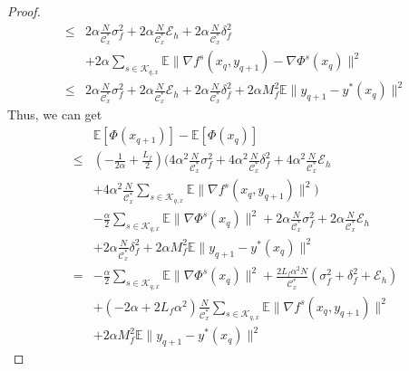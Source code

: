 \documentclass[lettersize,journal]{IEEEtran}
\begin{document}
\begin{proof}
\begin{align*}
    \leq &2\alpha \frac{N}{\mathcal{C}_x^*}\sigma_f^2+2\alpha\frac{N}{\mathcal{C}_x^*}\mathcal{E}_h+2\alpha\frac{N}{\mathcal{C}_x^*}\delta^2_f\\&+ 2\alpha \sum_{s\in \mathcal{K}_{q,x}}\mathbb{E}\|\nabla f^s(x_{q},y_{q+1})-\nabla \Phi^s(x_{q})\|^2\\
    \leq &2\alpha \frac{N}{\mathcal{C}_x^*}\sigma_f^2+2\alpha\frac{N}{\mathcal{C}_x^*}\mathcal{E}_h+2\alpha\frac{N}{\mathcal{C}_x^*}\delta^2_f+2\alpha M_f^2 \mathbb{E}\|y_{q+1}-y^*(x_q)\|^2
\end{align*}
Thus, we can get
\begin{align*}
&\mathbb{E}\left[\Phi(x_{q+1})\right]-\mathbb{E}\left[\Phi(x_q)\right]
\\\leq&(-\frac{1}{2\alpha}+\frac{L_f}{2})(4\alpha^2\frac{N}{\mathcal{C}_x^*}\sigma_f^2+4\alpha^2\frac{N}{\mathcal{C}_x^*}\delta^2_f+4\alpha^2\frac{N}{\mathcal{C}_x^*}\mathcal{E}_h\\&+4\alpha^2\frac{N}{\mathcal{C}_x^*}\sum_{s\in \mathcal{K}_{q,x}}\mathbb{E}\|\nabla f^s(x_{q},y_{q+1})\|^2)\\
& -\frac{\alpha}{2}\sum_{s\in \mathcal{K}_{q,x}}\mathbb{E}\|\nabla \Phi^s(x_{q})\|^2+2\alpha \frac{N}{\mathcal{C}_x^*}\sigma_f^2+2\alpha\frac{N}{\mathcal{C}_x^*}\mathcal{E}_h\\&+2\alpha\frac{N}{\mathcal{C}_x^*}\delta^2_f+2\alpha M_f^2\mathbb{E}\|y_{q+1}-y^*(x_q)\|^2\\ %
=&-\frac{\alpha}{2}\sum_{s\in \mathcal{K}_{q,x}}\mathbb{E}\|\nabla \Phi^s(x_{q})\|^2+\frac{2L_f\alpha^2 N}{\mathcal{C}_x^*}(\sigma_f^2+\delta^2_f+\mathcal{E}_h)\\
&+(-2\alpha+2 L_f\alpha^2)\frac{N}{\mathcal{C}_x^*}\sum_{s\in \mathcal{K}_{q,x}}\mathbb{E}\|\nabla f^s(x_{q},y_{q+1})\|^2\\&+2\alpha M_f^2\mathbb{E}\|y_{q+1}-y^*(x_q)\|^2
\end{align*}
\end{proof}
\end{document}
